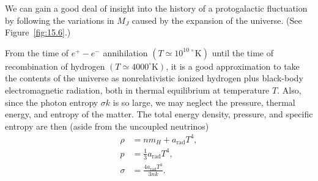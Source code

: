 We can gain a good deal of insight into the history of a protogalactic
fluctuation by following the variations in \(M_J\) caused by the expansion
of the universe. (See Figure~\ref{fig:15.6}.)

From the time of \(e^+-e^-\) annihilation
\((T\simeq10^{10\,\circ}\mathrm K)\) until the time of recombination of
hydrogen \((T\simeq4000^\circ\mathrm K)\), it is a good approximation to
take the contents of the universe as nonrelativistic ionized hydrogen plus
black-body electromagnetic radiation, both in thermal equilibrium at
temperature \(T\). Also, since the photon entropy \(\sigma k\) is so large,
we may neglect the pressure, thermal energy, and entropy of the matter. The
total energy density, pressure, and specific entropy are then (aside from the
uncoupled neutrinos)
\begin{align}
  \rho
  &=
  nm_H+a_{\mathrm{rad}}T^4,
  \tag{15.8.14}\label{eq:15.8.14}\\
  p
  &=
  \frac13a_{\mathrm{rad}}T^4,
  \tag{15.8.15}\label{eq:15.8.15}\\
  \sigma
  &=
  \frac{4a_{\mathrm{rad}}T^3}{3nk}.
  \tag{15.8.16}\label{eq:15.8.16}
\end{align}



